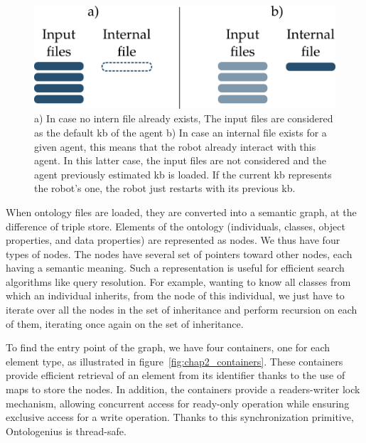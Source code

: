 \begin{figure}[ht!]
\centering
\includegraphics[scale=0.6]{figures/chapter2/files.png}
\caption{\label{fig:chap2_files} a) In case no intern file already exists, The input files are considered as the default \acrlong{kb} of the agent b) In case an internal file exists for a given agent, this means that the robot already interact with this agent. In this latter case, the input files are not considered and the agent previously estimated \acrlong{kb} is loaded. If the current \acrlong{kb} represents the robot's one, the robot just restarts with its previous \acrlong{kb}.}
\end{figure}

When ontology files are loaded, they are converted into a semantic graph, at the difference of triple store. Elements of the ontology (individuals, classes, object properties, and data properties) are represented as nodes. We thus have four types of nodes. The nodes have several set of pointers toward other nodes, each having a semantic meaning. Such a representation is useful for efficient search algorithms like query resolution. For example, wanting to know all classes from which an individual inherits, from the node of this individual, we just have to iterate over all the nodes in the set of inheritance and perform recursion on each of them, iterating once again on the set of inheritance.

To find the entry point of the graph, we have four containers, one for each element type, as illustrated in figure~\ref{fig:chap2_containers}. These containers provide efficient retrieval of an element from its identifier thanks to the use of maps to store the nodes. In addition, the containers provide a readers-writer lock mechanism, allowing concurrent access for ready-only operation while ensuring exclusive access for a write operation. Thanks to this synchronization primitive, Ontologenius is thread-safe.

